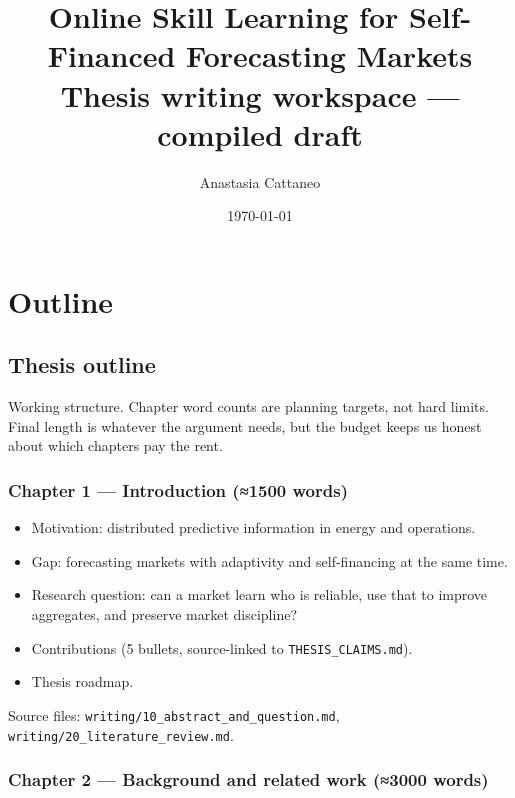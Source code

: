 \documentclass[11pt,a4paper,openany]{report}
\title{%
  Online Skill Learning for Self-Financed Forecasting Markets\\
  \vspace{0.3em}\large Thesis writing workspace — compiled draft%
}
\author{Anastasia Cattaneo}
\date{\today}
\begin{document}
\maketitle
\tableofcontents
\clearpage

\part*{Outline}
\chapter{Thesis outline}

Working structure. Chapter word counts are planning targets, not hard
limits. Final length is whatever the argument needs, but the budget keeps
us honest about which chapters pay the rent.

\section{Chapter 1 — Introduction (≈1500 words)}

\begin{itemize}
  \item Motivation: distributed predictive information in energy and operations.
  \item Gap: forecasting markets with adaptivity and self-financing at the same
    time.
  \item Research question: can a market learn who is reliable, use that to
    improve aggregates, and preserve market discipline?
  \item Contributions (5 bullets, source-linked to \texttt{THESIS\_CLAIMS.md}).
  \item Thesis roadmap.
\end{itemize}

Source files: \texttt{writing/10\_abstract\_and\_question.md},
\texttt{writing/20\_literature\_review.md}.

\section{Chapter 2 — Background and related work (≈3000 words)}
\end{document}
